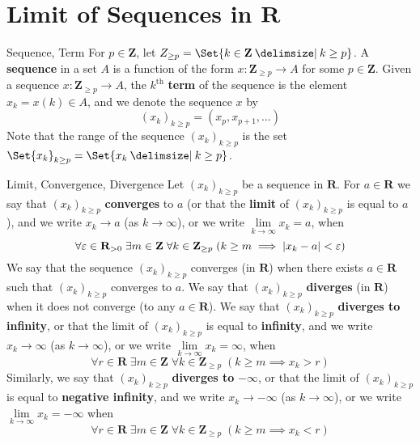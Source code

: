 \section{Limit of Sequences in \texorpdfstring{$ \mathbf{R} $}{R}}
\begin{Definition}{Sequence, Term}{}
    For $ p\in\mathbf{Z} $, let $ Z_{\ge p}=\Set{k\in\mathbf{Z}\given k\ge p} $.
    A \textbf{sequence} in a set $ A $ is a function of the form
    $ x:\mathbf{Z}_{\ge p}\to A $ for some $ p\in\mathbf{Z} $.
    Given a sequence $ x:\mathbf{Z}_{\ge p}\to A $, the $ k^{\text{th}} $
    \textbf{term} of the sequence is the element $ x_k=x(k)\in A $, and
    we denote the sequence $ x $ by
    \[ (x_k)_{k\ge p}=(x_p,x_{p+1},\ldots) \]
    Note that the range of the sequence $ (x_k)_{k\ge p} $
    is the set $ \Set{x_k}_{k\ge p}=\Set{x_k\given k\ge p} $.
\end{Definition}
\begin{Definition}{Limit, Convergence, Divergence}{}
    Let $ (x_k)_{k\ge p} $ be a sequence in $ \mathbf{R} $. For
    $ a\in\mathbf{R} $ we say that $ (x_k)_{k\ge p} $ \textbf{converges}
    to $ a $ (or that the \textbf{limit} of $ (x_k)_{k\ge p} $ is
    equal to $ a $), and we write $ x_k\to a $ (as $ k\to\infty $),
    or we write $ \lim\limits_{{k} \to {\infty}} x_k=a $, when
    \[ \forall\varepsilon\in\mathbf{R}_{>0}\;
        \exists m\in\mathbf{Z}\;\forall k\in\mathbf{Z}_{\ge p}\;
        (k\ge m\implies \lvert x_k-a\rvert<\varepsilon) \]
    We say that the sequence $ (x_k)_{k\ge p} $ converges
    (in $ \mathbf{R} $) when there exists $ a\in\mathbf{R} $
    such that $ (x_k)_{k\ge p} $ converges to $ a $. We say that
    $ (x_k)_{k\ge p} $ \textbf{diverges} (in $ \mathbf{R} $)
    when it does not converge (to any $ a\in\mathbf{R} $).
    We say that $ (x_k)_{k\ge p} $ \textbf{diverges to infinity},
    or that the limit of $ (x_k)_{k\ge p} $ is equal to
    \textbf{infinity}, and we write $ x_k\to\infty $
    (as $ k\to\infty $), or we write $ \lim\limits_{{k} \to {\infty}} x_k=\infty $,
    when
    \[ \forall r\in\mathbf{R}\;\exists m\in\mathbf{Z}\;
        \forall k\in\mathbf{Z}_{\ge p}\;(k\ge m\implies x_k>r) \]
    Similarly, we say that $ (x_k)_{k\ge p} $ \textbf{diverges to}
    $ -\infty $, or that the limit of $ (x_k)_{k\ge p} $ is equal
    to \textbf{negative infinity}, and we write $ x_k\to-\infty $
    (as $ k\to\infty $), or we write $ \lim\limits_{{k} \to {\infty}} x_k=-\infty $
    when
    \[ \forall r\in\mathbf{R}\;\exists m\in\mathbf{Z}\;
        \forall k\in\mathbf{Z}_{\ge p}\;(k\ge m\implies x_k<r) \]
\end{Definition}
